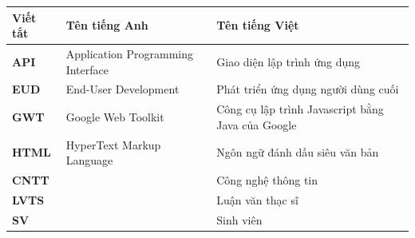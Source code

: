 \documentclass[../LuanVan.tex]{subfiles}
\begin{document}
\begin{longtable}{l p{6cm} p{7cm}}
	\hline
   \textbf{Viết tắt}  & \textbf{Tên tiếng Anh}	& \textbf{Tên tiếng Việt} \\ \hline 
	\textbf{API} & Application Programming Interface & Giao diện lập trình ứng dụng\\
	\textbf{EUD} & End-User Development & Phát triển ứng dụng người dùng cuối\\
	\textbf{GWT} & Google Web Toolkit & Công cụ lập trình Javascript bằng Java của Google\\
	\textbf{HTML} & HyperText Markup Language & Ngôn ngữ đánh dấu siêu văn bản\\
	\textbf{CNTT }  &   & Công nghệ thông tin\\
	\textbf{LVTS} &  & Luận văn thạc sĩ \\
	\textbf{SV} &  & Sinh viên \\

    \hline
\end{longtable}
\end{document}
